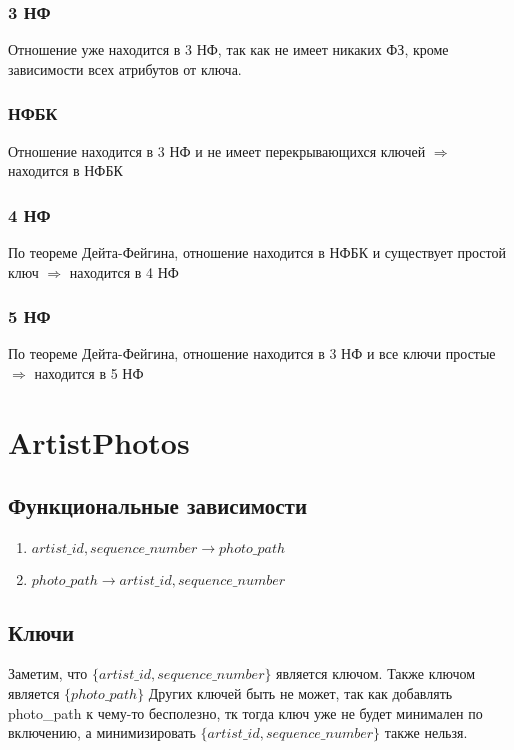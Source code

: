 \documentclass{article}
\begin{document}
\subsubsection{3 НФ}

Отношение уже находится в 3 НФ, так как не имеет никаких ФЗ, кроме зависимости всех атрибутов от ключа.

\subsubsection{НФБК}

Отношение находится в 3 НФ и не имеет перекрывающихся ключей $\Rightarrow$ находится в НФБК

\subsubsection{4 НФ}

По теореме Дейта-Фейгина, отношение находится в НФБК и существует простой ключ $\Rightarrow$ находится в 4 НФ

\subsubsection{5 НФ}

По теореме Дейта-Фейгина, отношение находится в 3 НФ и все ключи простые $\Rightarrow$ находится в 5 НФ


\section{ArtistPhotos}

\subsection{Функциональные зависимости}
\begin{enumerate}
	\item $artist\_id, sequence\_number \rightarrow photo\_path$
	\item $photo\_path \rightarrow artist\_id, sequence\_number$
\end{enumerate}

\subsection{Ключи}

Заметим, что $\{artist\_id, sequence\_number\}$ является ключом. Также ключом является $\{photo\_path\}$ Других ключей быть не может, так как  добавлять photo\_path к чему-то бесполезно, тк тогда ключ уже не будет минимален по включению, а минимизировать $\{artist\_id, sequence\_number\}$ также нельзя.
\end{document}
